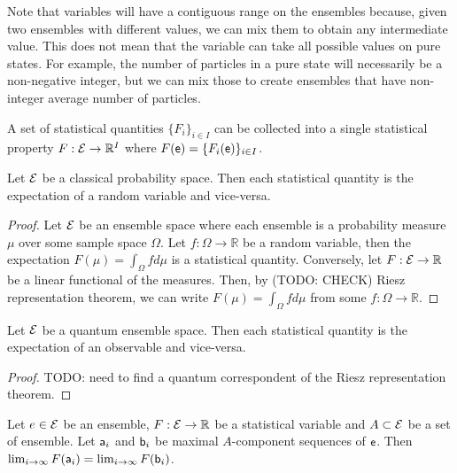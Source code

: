 \begin{remark}
	Note that variables will have a contiguous range on the ensembles because, given two ensembles with different values, we can mix them to obtain any intermediate value. This does not mean that the variable can take all possible values on pure states. For example, the number of particles in a pure state will necessarily be a non-negative integer, but we can mix those to create ensembles that have non-integer average number of particles.
\end{remark}

\begin{coro}
	A set of statistical quantities $\{F_i\}_{i \in I}$ can be collected into a single statistical property $F : \Ens \to \mathbb{R}^I$ where $F(\ens) = \{F_i(\ens)\}_{i \in I}$.
\end{coro}

\begin{prop}
	Let $\Ens$ be a classical probability space. Then each statistical quantity is the expectation of a random variable and vice-versa.
\end{prop}

\begin{proof}
	Let $\Ens$ be an ensemble space where each ensemble is a probability measure $\mu$ over some sample space $\Omega$. Let $f : \Omega \to \mathbb{R}$ be a random variable, then the expectation $F(\mu) = \int_{\Omega} f d\mu$ is a statistical quantity. Conversely, let $F : \Ens \to \mathbb{R}$ be a linear functional of the measures. Then, by (TODO: CHECK) Riesz representation theorem, we can write $F(\mu) = \int_{\Omega} f d\mu$ from some $f : \Omega \to \mathbb{R}$.
\end{proof}

\begin{conj}
	Let $\Ens$ be a quantum ensemble space. Then each statistical quantity is the expectation of an observable and vice-versa.
\end{conj}

\begin{proof}
	TODO: need to find a quantum correspondent of the Riesz representation theorem.
\end{proof}

\begin{conj}
	Let $e \in \Ens$ be an ensemble, $F : \Ens \to \mathbb{R}$ be a statistical variable and $A \subset \Ens$ be a set of ensemble. Let $\ens[a]_i$ and $\ens[b]_i$ be maximal $A$-component sequences of $\ens$. Then $\lim_{i \to \infty} F(\ens[a]_i) = \lim_{i \to \infty} F(\ens[b]_i)$.
\end{conj}

